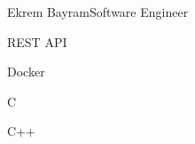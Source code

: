 \documentclass{article}
\begin{document}
\begin{cv}[avatar]{Ekrem Bayram}{Software Engineer}
    \cvseparator
    \begin{cvitem}
        REST API
    \end{cvitem}

    \cvseparator
    \begin{cvitem}
        Docker
    \end{cvitem}

    \cvseparator
    \begin{cvitem}
        C
    \end{cvitem}

    \cvseparator
    \begin{cvitem}
        C++
    \end{cvitem}





\end{cv}
\end{document}
